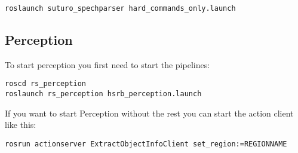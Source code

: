 \documentclass[main.tex]{subfiles}
\begin{document}
	\begin{lstlisting}
roslaunch suturo_spechparser hard_commands_only.launch
\end{lstlisting}
	
	\subsection{Perception}

	To start perception you first need to start the pipelines:\\
	\begin{lstlisting}
roscd rs_perception
roslaunch rs_perception hsrb_perception.launch
\end{lstlisting}	

If you want to start Perception without the rest you can start the action client like this:\\
\begin{lstlisting}
rosrun actionserver ExtractObjectInfoClient set_region:=REGIONNAME
\end{lstlisting}
\end{document}
